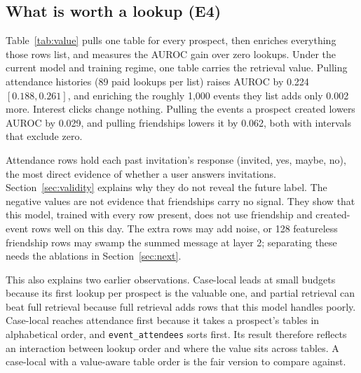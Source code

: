 \documentclass{article}
\begin{document}
\subsection{What is worth a lookup (E4)}
\label{sec:e4}
Table~\ref{tab:value} pulls one table for every prospect, then enriches everything those rows list, and measures the AUROC gain over zero lookups. Under the current model and training regime, one table carries the retrieval value. Pulling attendance histories (89 paid lookups per list) raises AUROC by 0.224 $[0.188, 0.261]$, and enriching the roughly 1,000 events they list adds only 0.002 more. Interest clicks change nothing. Pulling the events a prospect created lowers AUROC by 0.029, and pulling friendships lowers it by 0.062, both with intervals that exclude zero.

Attendance rows hold each past invitation's response (invited, yes, maybe, no), the most direct evidence of whether a user answers invitations. Section~\ref{sec:validity} explains why they do not reveal the future label. The negative values are not evidence that friendships carry no signal. They show that this model, trained with every row present, does not use friendship and created-event rows well on this day. The extra rows may add noise, or 128 featureless friendship rows may swamp the summed message at layer 2; separating these needs the ablations in Section~\ref{sec:next}.

This also explains two earlier observations. Case-local leads at small budgets because its first lookup per prospect is the valuable one, and partial retrieval can beat full retrieval because full retrieval adds rows that this model handles poorly. Case-local reaches attendance first because it takes a prospect's tables in alphabetical order, and \texttt{event\_attendees} sorts first. Its result therefore reflects an interaction between lookup order and where the value sits across tables. A case-local with a value-aware table order is the fair version to compare against.
\end{document}

